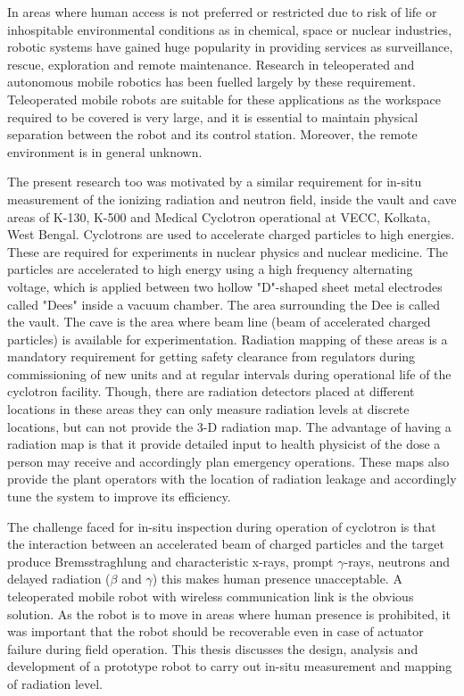  In areas where human access is not preferred or restricted  due to risk of life or inhospitable environmental conditions as in chemical, space or nuclear industries, robotic systems have gained huge popularity in providing services as surveillance, rescue, exploration and remote maintenance.  Research in teleoperated and autonomous mobile robotics has been fuelled largely by these  requirement. Teleoperated mobile robots are suitable for these applications  as the workspace required to be covered is very large, and it is essential to maintain  physical separation between the robot and its control station. Moreover, the remote environment is in general unknown. 
 
 The present research too was motivated by a similar requirement for in-situ measurement of the ionizing radiation and  neutron field, inside the vault and cave areas of   K-130,  K-500  and Medical Cyclotron operational at VECC, Kolkata, West Bengal. Cyclotrons are used to accelerate  charged particles to high energies. These are required for experiments in nuclear physics and nuclear medicine. The particles are accelerated to high energy using a high frequency alternating voltage, which is applied between two hollow "D"-shaped sheet metal electrodes called "Dees" inside a vacuum chamber. The area surrounding the Dee is called the vault.  The cave is the area where beam line (beam of  accelerated charged particles) is available for experimentation. Radiation mapping of these areas is a  mandatory requirement for getting safety clearance from regulators during  commissioning of new units and at regular intervals during operational life of the cyclotron facility.   Though, there are radiation detectors placed at different locations in these areas they can only measure radiation levels at discrete locations, but can not provide the 3-D radiation  map. The advantage of having a  radiation map is that it  provide detailed  input to health physicist  of the dose a person may receive and accordingly plan emergency  operations. These maps also provide the plant operators with the location of radiation leakage and accordingly tune the system to improve its efficiency.

The challenge faced for in-situ inspection during operation of cyclotron is that the interaction  between  an  accelerated  beam   of  charged  particles  and  the  target  produce Bremsstraghlung and characteristic x-rays, prompt $\gamma$-rays, neutrons and delayed radiation ($\beta $ and $\gamma$) this makes human presence unacceptable.  A teleoperated mobile robot with wireless communication link is the obvious solution. As the robot is to move in areas where human presence is prohibited, it was important that the robot should be recoverable even in case of actuator failure during field operation.  This thesis discusses the design, analysis and development of a prototype robot  to carry out in-situ measurement and mapping of radiation level.


